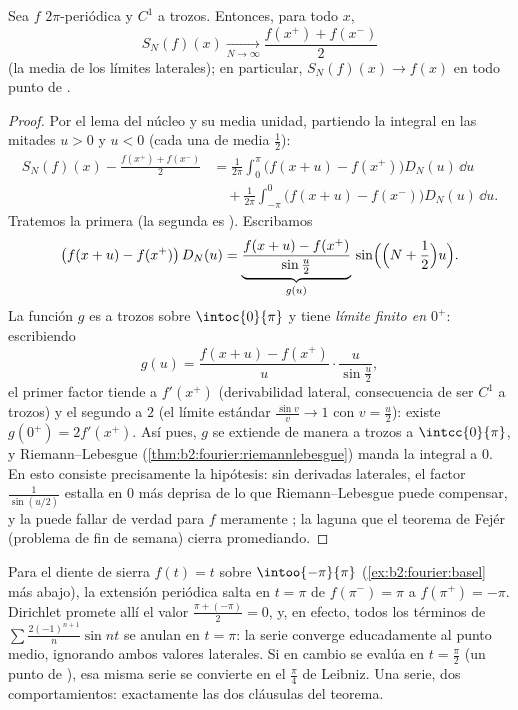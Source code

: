 \begin{theorem}[Dirichlet]\label{thm:b2:fourier:dirichlet}
Sea $f$ $2\pi$-periódica y $C^1$ a trozos. Entonces, para todo $x$,
\[
S_N(f)(x) \xrightarrow[N \to \infty]{}
\frac{f(x^+) + f(x^-)}{2}
\]
(la media de los límites laterales); en particular, $S_N(f)(x) \to
f(x)$ en todo punto de .
\end{theorem}


\begin{proof}
Por el lema del núcleo y su media unidad, partiendo la integral en
las mitades $u > 0$ y $u < 0$ (cada una de media $\frac12$):
\begin{align*}
S_N(f)(x) - \frac{f(x^+) + f(x^-)}{2}
&= \frac{1}{2\pi}\int_{0}^{\pi} \bigl(f(x+u) -
f(x^+)\bigr)D_N(u)\,\dd u\\
&\quad+ \frac{1}{2\pi}\int_{-\pi}^{0}\bigl(f(x+u) -
f(x^-)\bigr)D_N(u)\,\dd u .
\end{align*}
Tratemos la primera (la segunda es ). Escribamos
\[
\bigl(f(x + u) - f(x^+)\bigr)\,D_N(u)
= \underbrace{\frac{f(x+u) - f(x^+)}{\sin\frac u2}}_{g(u)}\,
\sin\Bigl(\Bigl(N + \frac12\Bigr)u\Bigr) .
\]
La función $g$ es  a trozos sobre $\intoc{0}{\pi}$ y tiene
\emph{límite finito en $0^+$}: escribiendo
\[
g(u) = \frac{f(x+u) - f(x^+)}{u}\cdot\frac{u}{\sin\frac u2} ,
\]
el primer factor tiende a $f'(x^+)$ (derivabilidad lateral,
consecuencia de ser $C^1$ a trozos) y el segundo a $2$ (el límite
estándar $\frac{\sin v}{v} \to 1$ con $v = \frac u2$): existe
$g(0^+) = 2f'(x^+)$. Así pues, $g$ se extiende de manera  a
trozos a $\intcc{0}{\pi}$, y Riemann--Lebesgue
(\cref{thm:b2:fourier:riemannlebesgue}) manda la integral a $0$. En
esto consiste precisamente la hipótesis: sin derivadas laterales, el
factor $\frac{1}{\sin(u/2)}$ estalla en $0$ más deprisa de lo que
Riemann--Lebesgue puede compensar, y la  puede
fallar de verdad para $f$ meramente ; la laguna que el
teorema de Fejér (problema de fin de semana) cierra promediando.
\end{proof}

\begin{example}\label{ex:b2:fourier:jumpvalue}
Para el diente de sierra $f(t) = t$ sobre $\intoo{-\pi}{\pi}$
(\cref{ex:b2:fourier:basel} más abajo), la extensión periódica salta
en $t = \pi$ de $f(\pi^-) = \pi$ a $f(\pi^+) = -\pi$. Dirichlet
promete allí el valor $\frac{\pi + (-\pi)}{2} = 0$, y, en efecto,
todos los términos de $\sum \frac{2(-1)^{n+1}}{n}\sin nt$ se anulan
en $t = \pi$: la serie converge educadamente al punto medio,
ignorando ambos valores laterales. Si en cambio se evalúa en $t =
\frac\pi2$ (un punto de ), esa misma serie se convierte en
el $\frac\pi4$ de Leibniz. Una serie, dos comportamientos:
exactamente las dos cláusulas del teorema.
\end{example}

